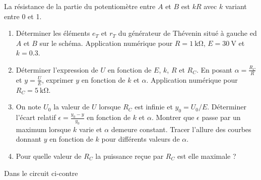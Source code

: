 \begin{exercice}
La résistance de la partie du potentiomètre entre $A$ et $B$ est $kR$ avec $k$ variant entre 0 et 1.
	\begin{enumerate}
		\item Déterminer les éléments $e_T$ et $r_T$ du générateur de Thévenin situé à gauche ed $A$ et $B$ sur le schéma. Application numérique pour $R=\SI{1}{\kilo\ohm}$, $E=\SI{30}{\volt}$ et $k=0.3$.
		\item Déterminer l'expression de $U$ en fonction de $E$, $k$, $R$ et $R_C$. En posant $\alpha = \frac{R_C}{R}$ et $y= \frac{U}{E}$, exprimer $y$ en fonction de $k$ et $\alpha$. Application numérique pour $R_C=\SI{5}{\kilo\ohm}$.
		\item On note $U_0$ la valeur de $U$ lorsque $R_C$ est infinie et $y_0 = U_0/E$. Déterminer l'écart relatif $\epsilon = \frac{y_0-y}{y_0}$ en fonction de $k$ et $\alpha$. Montrer que $\epsilon$ passe par un maximum lorsque $k$ varie et $\alpha$ demeure constant. Tracer l'allure des courbes donnant $y$ en fonction de $k$ pour différents valeurs de $\alpha$.
		\item Pour quelle valeur de $R_C$ la puissance reçue par $R_C$ est elle maximale ?
	\end{enumerate}
\end{exercice}

\begin{exercice}
	Dans le circuit ci-contre
\end{exercice}
